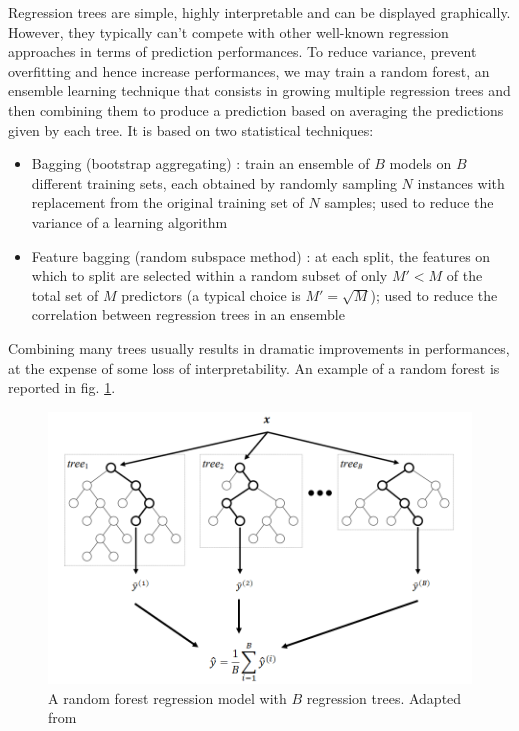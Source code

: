 \smallskip

Regression trees are simple, highly interpretable and can be displayed graphically. However, they typically can't compete with other well-known regression approaches in terms of prediction performances. To reduce variance, prevent overfitting and hence increase performances, we may train a random forest, an ensemble learning technique that consists in growing multiple regression trees and then combining them to produce a prediction based on averaging the predictions given by each tree. It is based on two statistical techniques:
\begin{itemize}
    \item Bagging (bootstrap aggregating) \cite{bagging}: train an ensemble of $B$ models on $B$ different training sets, each obtained by randomly sampling $N$ instances with replacement from the original training set of $N$ samples; used to reduce the variance of a learning algorithm
    \item Feature bagging (random subspace method) \cite{feature_bagging}: at each split, the features on which to split are selected within a random subset of only $M'<M$ of the total set of $M$ predictors (a typical choice is $M'=\sqrt{M}$); used to reduce the correlation between regression trees in an ensemble
\end{itemize}

Combining many trees usually results in dramatic improvements in performances, at the expense of some loss of interpretability. An example of a random forest is reported in fig. \ref{fig:random_forest}.

\begin{figure}[hbt!]
    \centering
    \includegraphics[width=\textwidth]{images/random_forest}
    \caption[A RF with $B$ regression trees]{A random forest regression model with $B$ regression trees. Adapted from \cite{random_forest_img}}
    \label{fig:random_forest}
\end{figure}





